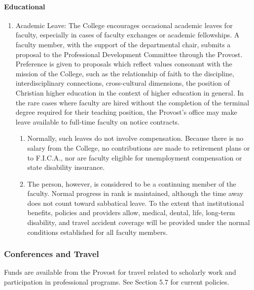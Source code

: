 \documentclass[letterpaper, 11pt]{article}
\begin{document}
			\paragraph{Educational}
				\begin{enumerate}[label=\alph*)]
					\item{Academic Leave:  The College encourages occasional academic leaves for faculty, especially in cases of faculty exchanges or academic fellowships.  A faculty member, with the support of the departmental chair, submits a proposal to the Professional Development Committee through the Provost.  Preference is given to proposals which reflect values consonant with the mission of the College, such as the relationship of faith to the discipline, interdisciplinary connections, cross-cultural dimensions, the position of Christian higher education in the context of higher education in general.  In the rare cases where faculty are hired without the completion of the terminal degree required for their teaching position, the Provost's office may make leave available to full-time faculty on notice contracts.
						\begin{enumerate}[label=\arabic*)]
							\item{Normally, such leaves do not involve compensation.  Because there is no salary from the College, no contributions are made to retirement plans or to F.I.C.A., nor are faculty eligible for unemployment compensation or state disability insurance.}
							\item{The person, however, is considered to be a continuing member of the faculty. Normal progress in rank is maintained, although the time away does not count toward sabbatical leave.  To the extent that institutional benefits, policies and providers allow, medical, dental, life, long-term disability, and travel accident coverage will be provided under the normal conditions established for all faculty members.}
						\end{enumerate}
					}
				\end{enumerate}
		\subsubsection{Conferences and Travel}
			Funds are available from the Provost for travel related to scholarly work and participation in professional programs.  See Section 5.7 for current policies.
\end{document}

